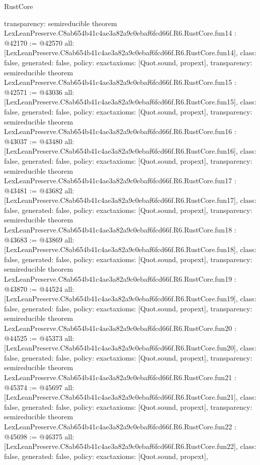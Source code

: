 \begin{lexlean}{RustCore}
\begin{coremodule}
{  transparency: semireducible
}
theorem LexLeanPreserve.C8ab654b41c4ae3a82a9c0ebaf6fcd66f.R6.RustCore.fun14 : @42170 := @42570 {
  all: [LexLeanPreserve.C8ab654b41c4ae3a82a9c0ebaf6fcd66f.R6.RustCore.fun14],
  class: false,
  generated: false,
  policy: exact{axioms: [Quot.sound, propext]},
  transparency: semireducible
}
theorem LexLeanPreserve.C8ab654b41c4ae3a82a9c0ebaf6fcd66f.R6.RustCore.fun15 : @42571 := @43036 {
  all: [LexLeanPreserve.C8ab654b41c4ae3a82a9c0ebaf6fcd66f.R6.RustCore.fun15],
  class: false,
  generated: false,
  policy: exact{axioms: [Quot.sound, propext]},
  transparency: semireducible
}
theorem LexLeanPreserve.C8ab654b41c4ae3a82a9c0ebaf6fcd66f.R6.RustCore.fun16 : @43037 := @43480 {
  all: [LexLeanPreserve.C8ab654b41c4ae3a82a9c0ebaf6fcd66f.R6.RustCore.fun16],
  class: false,
  generated: false,
  policy: exact{axioms: [Quot.sound, propext]},
  transparency: semireducible
}
theorem LexLeanPreserve.C8ab654b41c4ae3a82a9c0ebaf6fcd66f.R6.RustCore.fun17 : @43481 := @43682 {
  all: [LexLeanPreserve.C8ab654b41c4ae3a82a9c0ebaf6fcd66f.R6.RustCore.fun17],
  class: false,
  generated: false,
  policy: exact{axioms: [Quot.sound, propext]},
  transparency: semireducible
}
theorem LexLeanPreserve.C8ab654b41c4ae3a82a9c0ebaf6fcd66f.R6.RustCore.fun18 : @43683 := @43869 {
  all: [LexLeanPreserve.C8ab654b41c4ae3a82a9c0ebaf6fcd66f.R6.RustCore.fun18],
  class: false,
  generated: false,
  policy: exact{axioms: [Quot.sound, propext]},
  transparency: semireducible
}
theorem LexLeanPreserve.C8ab654b41c4ae3a82a9c0ebaf6fcd66f.R6.RustCore.fun19 : @43870 := @44524 {
  all: [LexLeanPreserve.C8ab654b41c4ae3a82a9c0ebaf6fcd66f.R6.RustCore.fun19],
  class: false,
  generated: false,
  policy: exact{axioms: [Quot.sound, propext]},
  transparency: semireducible
}
theorem LexLeanPreserve.C8ab654b41c4ae3a82a9c0ebaf6fcd66f.R6.RustCore.fun20 : @44525 := @45373 {
  all: [LexLeanPreserve.C8ab654b41c4ae3a82a9c0ebaf6fcd66f.R6.RustCore.fun20],
  class: false,
  generated: false,
  policy: exact{axioms: [Quot.sound, propext]},
  transparency: semireducible
}
theorem LexLeanPreserve.C8ab654b41c4ae3a82a9c0ebaf6fcd66f.R6.RustCore.fun21 : @45374 := @45697 {
  all: [LexLeanPreserve.C8ab654b41c4ae3a82a9c0ebaf6fcd66f.R6.RustCore.fun21],
  class: false,
  generated: false,
  policy: exact{axioms: [Quot.sound, propext]},
  transparency: semireducible
}
theorem LexLeanPreserve.C8ab654b41c4ae3a82a9c0ebaf6fcd66f.R6.RustCore.fun22 : @45698 := @46375 {
  all: [LexLeanPreserve.C8ab654b41c4ae3a82a9c0ebaf6fcd66f.R6.RustCore.fun22],
  class: false,
  generated: false,
  policy: exact{axioms: [Quot.sound, propext]},
}
\end{coremodule}
\end{lexlean}
